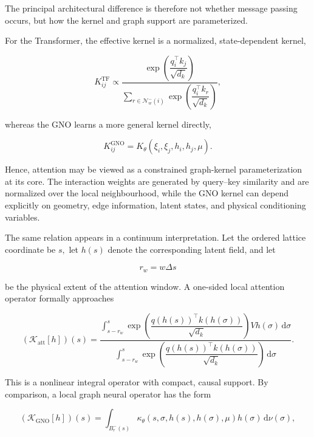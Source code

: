The principal architectural difference is therefore not whether message passing occurs, but how the kernel and graph support are parameterized.

For the Transformer, the effective kernel is a normalized, state-dependent kernel,

\begin{equation}
\label{eq:199}
K_{ij}^{\mathrm{TF}}\propto\frac{\exp\left(\dfrac{q_i^{\top}k_j}{\sqrt{d_k}}\right)}{\displaystyle\sum_{r\in\mathcal N_w^{-}(i)}\exp\left(\dfrac{q_i^{\top}k_r}{\sqrt{d_k}}\right)},
\end{equation}

whereas the GNO learns a more general kernel directly,

\begin{equation}
\label{eq:200}
K_{ij}^{\mathrm{GNO}}=K_{\theta}(\xi_i,\xi_j,h_i,h_j,\mu).
\end{equation}

Hence, attention may be viewed as a constrained graph-kernel parameterization at its core. The interaction weights are generated by query–key similarity and are normalized over the local neighbourhood, while the GNO kernel can depend explicitly on geometry, edge information, latent states, and physical conditioning variables.

The same relation appears in a continuum interpretation. Let the ordered lattice coordinate be \(s ,\) let \(h ( s )\) denote the corresponding latent field, and let

\begin{equation}
\label{eq:201}
r_w=w\Delta s
\end{equation}

be the physical extent of the attention window. A one-sided local attention operator formally approaches

\begin{equation}
\label{eq:202}
(\mathcal K_{\mathrm{att}}[h])(s)=\frac{\displaystyle\int_{s-r_w}^{s}\exp\left(\dfrac{q(h(s))^{\top}k(h(\sigma))}{\sqrt{d_k}}\right)Vh(\sigma)\,\mathrm d\sigma}{\displaystyle\int_{s-r_w}^{s}\exp\left(\dfrac{q(h(s))^{\top}k(h(\sigma))}{\sqrt{d_k}}\right)\,\mathrm d\sigma}.
\end{equation}

This is a nonlinear integral operator with compact, causal support. By comparison, a local graph neural operator has the form

\begin{equation}
\label{eq:203}
(\mathcal K_{\mathrm{GNO}}[h])(s)=\int_{B_r^{-}(s)}\kappa_{\theta}(s,\sigma,h(s),h(\sigma),\mu)h(\sigma)\,\mathrm d\nu(\sigma),
\end{equation}

